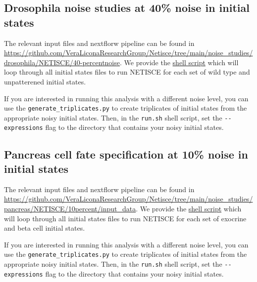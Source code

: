 \documentclass[
]{book}
\begin{document}
\hypertarget{drosophila-noise-studies-at-40-noise-in-initial-states}{%
\subsection{Drosophila noise studies at 40\% noise in initial states}\label{drosophila-noise-studies-at-40-noise-in-initial-states}}

The relevant input files and nextflorw pipeline can be found in \url{https://github.com/VeraLiconaResearchGroup/Netisce/tree/main/noise_studies/drosophila/NETISCE/40-percentnoise}.
We provide the \href{https://github.com/VeraLiconaResearchGroup/Netisce/blob/main/noise_studies/drosophila/NETISCE/40-percentnoise/run.sh}{shell script} which will loop through all initial states files to run NETISCE for each set of wild type and unpatterened initial states.

If you are interested in running this analysis with a different noise level, you can use the \texttt{generate\_triplicates.py} to create triplicates of initial states from the appropriate noisy initial states. Then, in the \texttt{run.sh} shell script, set the \texttt{-\/-expressions} flag to the directory that contains your noisy initial states.

\hypertarget{pancreas-cell-fate-specification-at-10-noise-in-initial-states}{%
\subsection{Pancreas cell fate specification at 10\% noise in initial states}\label{pancreas-cell-fate-specification-at-10-noise-in-initial-states}}

The relevant input files and nextflorw pipeline can be found in \url{https://github.com/VeraLiconaResearchGroup/Netisce/tree/main/noise_studies/pancreas/NETISCE/10percent/input_data}.
We provide the \href{https://github.com/VeraLiconaResearchGroup/Netisce/blob/main/noise_studies/pancreas/NETISCE/10percent/run10.sh}{shell script} which will loop through all initial states files to run NETISCE for each set of exocrine and beta cell initial states.

If you are interested in running this analysis with a different noise level, you can use the \texttt{generate\_triplicates.py} to create triplicates of initial states from the appropriate noisy initial states. Then, in the \texttt{run.sh} shell script, set the \texttt{-\/-expressions} flag to the directory that contains your noisy initial states.
\end{document}
